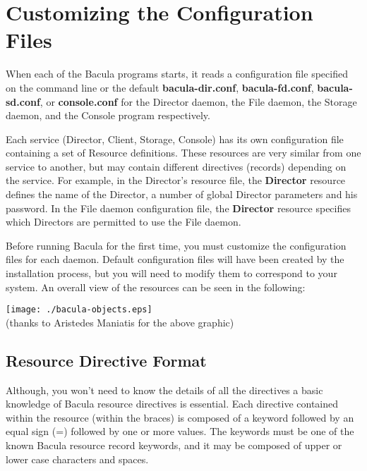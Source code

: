 
\section*{Customizing the Configuration Files}
\label{_ChapterStart16}

When each of the Bacula programs starts, it reads a configuration file
specified on the command line or the default {\bf bacula-dir.conf}, {\bf
bacula-fd.conf}, {\bf bacula-sd.conf}, or {\bf console.conf} for the Director
daemon, the File daemon, the Storage daemon, and the Console program
respectively. 

Each service (Director, Client, Storage, Console) has its own configuration
file containing a set of Resource definitions. These resources are very
similar from one service to another, but may contain different directives
(records) depending on the service. For example, in the Director's resource
file, the {\bf Director} resource defines the name of the Director, a number
of global Director parameters and his password. In the File daemon
configuration file, the {\bf Director} resource specifies which Directors are
permitted to use the File daemon. 

Before running Bacula for the first time, you must customize the configuration
files for each daemon. Default configuration files will have been created by
the installation process, but you will need to modify them to correspond to
your system. An overall view of the resources can be seen in the following: 

\texttt{[image: ./bacula-objects.eps]} 
\\
(thanks to Aristedes Maniatis for the above graphic) 
\label{ResFormat}

\subsection*{Resource Directive Format}

Although, you won't need to know the details of all the directives a basic
knowledge of Bacula resource directives is essential. Each directive contained
within the resource (within the braces) is composed of a keyword followed by
an equal sign (=) followed by one or more values. The keywords must be one of
the known Bacula resource record keywords, and it may be composed of upper or
lower case characters and spaces. 

